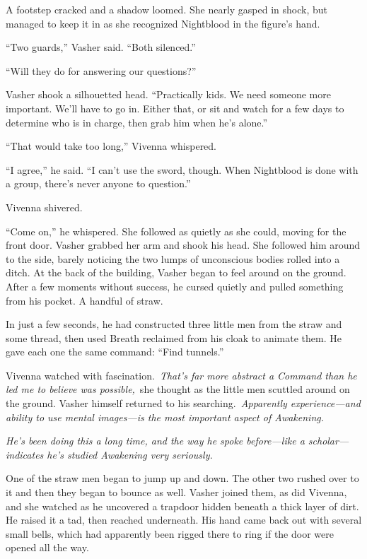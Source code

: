A footstep cracked and a shadow loomed. She nearly gasped in shock, but managed to keep it in as she recognized Nightblood in the figure’s hand.

“Two guards,” Vasher said. “Both silenced.”

“Will they do for answering our questions?”

Vasher shook a silhouetted head. “Practically kids. We need someone more important. We’ll have to go in. Either that, or sit and watch for a few days to determine who is in charge, then grab him when he’s alone.”

“That would take too long,” Vivenna whispered.

“I agree,” he said. “I can’t use the sword, though. When Nightblood is done with a group, there’s never anyone to question.”

Vivenna shivered.

“Come on,” he whispered. She followed as quietly as she could, moving for the front door. Vasher grabbed her arm and shook his head. She followed him around to the side, barely noticing the two lumps of unconscious bodies rolled into a ditch. At the back of the building, Vasher began to feel around on the ground. After a few moments without success, he cursed quietly and pulled something from his pocket. A handful of straw.

In just a few seconds, he had constructed three little men from the straw and some thread, then used Breath reclaimed from his cloak to animate them. He gave each one the same command: “Find tunnels.”

Vivenna watched with fascination.~\textit{That’s far more abstract a Command than he led me to believe was possible,}~she thought as the little men scuttled around on the ground. Vasher himself returned to his searching.~\textit{Apparently experience—and ability to use mental images—is the most important aspect of Awakening.}

\textit{He’s been doing this a long time, and the way he spoke before—like a scholar—indicates he’s studied Awakening very seriously.}

One of the straw men began to jump up and down. The other two rushed over to it and then they began to bounce as well. Vasher joined them, as did Vivenna, and she watched as he uncovered a trapdoor hidden beneath a thick layer of dirt. He raised it a tad, then reached underneath. His hand came back out with several small bells, which had apparently been rigged there to ring if the door were opened all the way.

